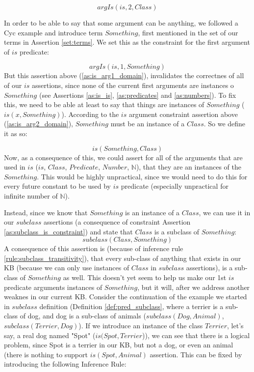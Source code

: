 \begin{equation}\label{as:is_arg2_domain}
argIs(is,2, Class)
\end{equation}

In order to be able to say that some argument can be anything, we followed a 
Cyc example and introduce term $Something$, first mentioned in the set of our 
terms in Assertion \ref{set:terms}. We set this as the constraint for the first
argument of $is$ predicate:

\begin{equation}\label{as:is_arg1_domain}
argIs(is,1, Something)
\end{equation}
But this assertion above (\ref{as:is_arg1_domain}), invalidates the correctnes
of all of our $is$ assertions, since none of the current first arguments are
instances o $Something$ (see Assertions \ref{as:is_is}, \ref{as:predicates} and 
\ref{as:numbers}). To fix this, we need to be able at least to say that things 
are instances of $Something$ ($is(x,Something)$). According to the $is$ argument
constraint assertion above (\ref{as:is_arg2_domain}), $Something$ must be an 
instance of a $Class$. So we define it as so:

\begin{equation}\label{as:is_something}
	is(Something,Class)
\end{equation}
Now, as a consequence of this, we could assert for all of the arguments that
are used in $is$ ($is$, $Class$, $Predicate$, $Number$, $\mathbb{N}$), that 
they are an instances of the $Something$. This would
be highly unpractical, since we would need to do this for every future constant
to be used by $is$ predicate (especially unpractical for infinite number of
$\mathbb{N}$).

Instead, since we know that $Something$ is an instance of a $Class$, we can use 
it in our $subclass$ assertions (a consequence of constraint Assertion 
\ref{as:subclass_is_constraint}) and state that $Class$ is a subclass of 
$Something$:
\begin{equation}\label{as:subclass_something}
	subclass(Class, Something)
\end{equation}
A consequence of this assertion is (because of inference rule 
\ref{rule:subclass_transitivity}), that
every sub-class of anything that exists in our KB (because we can only use 
instances of $Class$ in $subclass$ assertions), is a sub-class of $Something$ as
well. This doesn't yet seem to help us make our 1st $is$ predicate arguments 
instances of $Something$, but it will, after we address another weaknes in our
current KB. 
Consider the continuation of the example we started in $subclass$ 
definition (Definition \ref{def:pred_subclass}, where a terrier is a sub-class
of dog, and dog is a sub-class of animals ($subclass(Dog,Animal)$, 
$subclass(Terrier,Dog)$). If we introduce an instance of the
class $Terrier$, let's say, a real dog named "Spot" ($is(Spot,Terrier$)), we can
see that there is a logical problem, since Spot is a terrier in our KB, but
not a dog, or even an animal (there is nothing to support $is(Spot,Animal)$ 
assertion. This can be fixed by introducing the following Inference Rule:

